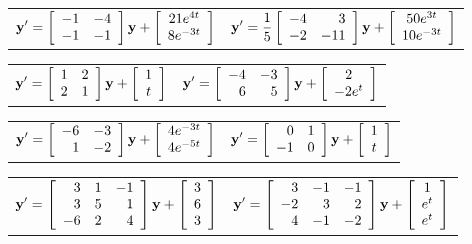 \begin{exerciselist}
  \begin{tabular}[t]{@{}p{168pt}@{}p{168pt}}
    \item\label{exer:10.7.1}$\displaystyle{{\bf y}'=\left[\begin{array}{rr} -1&-4\\-1&-1\end{array}\right]{\bf y}+\left[\begin{array}{cc}21e^{4t}\\8e^{-3t}\end{array}\right]}$ & \vspace*{10pt}
    \item\label{exer:10.7.2}$\displaystyle{{\bf y}'=\frac{1}{5}\left[\begin{array}{rr} -4&3\\-2&-11\end{array}\right]{\bf y}+\left[\begin{array}{cc}50e^{3t}\\10e^{-3t}\end{array}\right]}$
  \end{tabular}

  \begin{tabular}[t]{@{}p{168pt}@{}p{168pt}}
    \item\label{exer:10.7.3}$\displaystyle{{\bf y}'=\left[\begin{array}{rr} 1&2\\2&1\end{array}\right]{\bf y}+\left[\begin{array}{cc}1\\t\end{array}\right]}$ &
    \item\label{exer:10.7.4}$\displaystyle{{\bf y}'=\left[\begin{array}{rr} -4&-3\\6&5\end{array}\right]{\bf y}+\left[\begin{array}{cc}2\\-2e^{t}\end{array}\right]}$
  \end{tabular}

  \begin{tabular}[t]{@{}p{168pt}@{}p{168pt}}
    \item\label{exer:10.7.5}$\displaystyle{{\bf y}'=\left[\begin{array}{rr} -6&-3\\1&-2\end{array}\right]{\bf y}+\left[\begin{array}{cc}4e^{-3t}\\4e^{-5t}\end{array}\right]}$ &
    \item\label{exer:10.7.6}$\displaystyle{{\bf y}'=\left[\begin{array}{rr} 0&1\\-1&0\end{array}\right]{\bf y}+\left[\begin{array}{cc}1\\t\end{array}\right]}$
  \end{tabular}

  \begin{tabular}[t]{@{}p{168pt}@{}p{168pt}}
    \item\label{exer:10.7.7}$\displaystyle{{\bf y}'=\left[\begin{array}{rrr} 3&1&-1\\3&5&1\\-6&2&4\end{array}\right]{\bf y}+\left[\begin{array}{cc}3\\6\\3\end{array}\right]}$ &
    \item\label{exer:10.7.8}$\displaystyle{{\bf y}'=\left[\begin{array}{rrr} 3&-1&-1\\-2&3&2\\4&-1&-2\end{array}\right]{\bf y}+\left[\begin{array}{cc}1\\e^{t}\\e^{t}\end{array}\right]}$
  \end{tabular}


\end{exerciselist}
